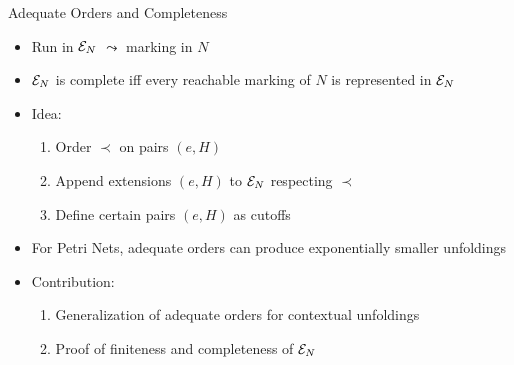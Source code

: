 \documentclass[table,red,11pt]{beamer}
\begin{document}
\begin{frame}{Adequate Orders and Completeness}
\begin{itemize}


\item \alert{Run} in $\mathcal{E}_{N}$ $\leadsto$ \alert{marking} in $N$

\item<2-> $\mathcal{E}_{N}$ is \alert{complete} iff every reachable marking of $N$ is
represented in $\mathcal{E}_{N}$

\item<3-> Idea:
\begin{enumerate}
\item Order $\prec$ on pairs $(e, H)$
\item Append extensions $(e, H)$ to $\mathcal{E}_{N}$ respecting $\prec$
\item Define certain pairs $(e, H)$ as \alert{cutoffs}
\end{enumerate}

\item<4-> For Petri Nets, \alert{adequate orders} can produce exponentially
smaller unfoldings

\item<5-> Contribution:
\begin{enumerate}
\item Generalization of adequate orders for contextual unfoldings
\item Proof of finiteness and completeness of $\mathcal{E}_{N}$
\end{enumerate}

\end{itemize}
\end{frame}
\end{document}
